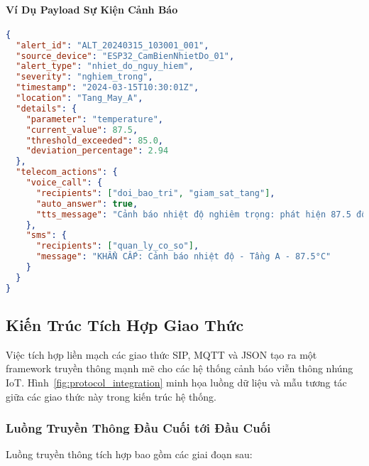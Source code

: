 \paragraph{Ví Dụ Payload Sự Kiện Cảnh Báo}
\begin{lstlisting}[language=json, caption=Payload Sự Kiện Cảnh Báo cho Hành Động Viễn Thông, label=lst:alert_payload]
{
  "alert_id": "ALT_20240315_103001_001",
  "source_device": "ESP32_CamBienNhietDo_01",
  "alert_type": "nhiet_do_nguy_hiem",
  "severity": "nghiem_trong",
  "timestamp": "2024-03-15T10:30:01Z",
  "location": "Tang_May_A",
  "details": {
    "parameter": "temperature",
    "current_value": 87.5,
    "threshold_exceeded": 85.0,
    "deviation_percentage": 2.94
  },
  "telecom_actions": {
    "voice_call": {
      "recipients": ["doi_bao_tri", "giam_sat_tang"],
      "auto_answer": true,
      "tts_message": "Cảnh báo nhiệt độ nghiêm trọng: phát hiện 87.5 độ C tại Tầng Máy A"
    },
    "sms": {
      "recipients": ["quan_ly_co_so"],
      "message": "KHẨN CẤP: Cảnh báo nhiệt độ - Tầng A - 87.5°C"
    }
  }
}
\end{lstlisting}
\subsection{Kiến Trúc Tích Hợp Giao Thức}
\label{subsec:protocol_integration}


Việc tích hợp liền mạch các giao thức SIP, MQTT và JSON tạo ra một framework truyền thông mạnh mẽ cho các hệ thống cảnh báo viễn thông nhúng IoT. Hình~\ref{fig:protocol_integration} minh họa luồng dữ liệu và mẫu tương tác giữa các giao thức này trong kiến trúc hệ thống.




\subsubsection{Luồng Truyền Thông Đầu Cuối tới Đầu Cuối}
\label{subsubsec:e2e_communication}

Luồng truyền thông tích hợp bao gồm các giai đoạn sau:

